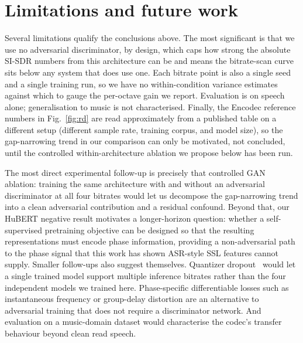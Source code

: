 \documentclass[11pt]{article}
\begin{document}
\section{Limitations and future work}
\label{sec:future}

Several limitations qualify the conclusions above. The most
significant is that we use no adversarial discriminator, by design,
which caps how strong the absolute SI-SDR numbers from this
architecture can be and means the bitrate-scan curve sits below
any system that does use one. Each bitrate point is also a single
seed and a single training run, so we have no within-condition
variance estimates against which to gauge the per-octave gain we
report. Evaluation is on speech alone; generalisation to music is
not characterised. Finally, the Encodec reference numbers in
Fig.~\ref{fig:rd} are read approximately from a published table
on a different setup (different sample rate, training corpus, and
model size), so the gap-narrowing trend in our comparison can only
be motivated, not concluded, until the controlled within-architecture
ablation we propose below has been run.

The most direct experimental follow-up is precisely that controlled
GAN ablation: training the same architecture with and without an
adversarial discriminator at all four bitrates would let us
decompose the gap-narrowing trend into a clean adversarial
contribution and a residual confound. Beyond that, our HuBERT
negative result motivates a longer-horizon question: whether a
self-supervised pretraining objective can be designed so that the
resulting representations must encode phase information, providing
a non-adversarial path to the phase signal that this work has shown
ASR-style SSL features cannot supply. Smaller follow-ups also
suggest themselves. Quantizer dropout~\citep{zeghidour2021soundstream}
would let a single trained model support multiple inference
bitrates rather than the four independent models we trained here.
Phase-specific differentiable losses such as instantaneous
frequency or group-delay distortion are an alternative to
adversarial training that does not require a discriminator network.
And evaluation on a music-domain dataset would characterise the
codec's transfer behaviour beyond clean read speech.

{\small
\setlength{\bibsep}{0.15em plus 0.1em}


}
\end{document}
